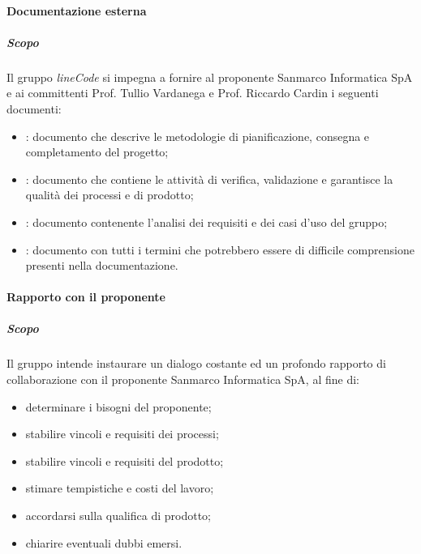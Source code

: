 		\paragraph{Documentazione esterna}
            \subparagraph{Scopo}
    		Il gruppo \textit{lineCode} si impegna a fornire al proponente Sanmarco Informatica SpA e ai committenti Prof. Tullio Vardanega e Prof. Riccardo Cardin i seguenti documenti:
    		\begin{itemize}
    		 	\item {}: documento che descrive le metodologie di pianificazione, consegna e completamento del progetto;
    		 	\item {}: documento che contiene le attività di verifica, validazione e garantisce la qualità dei processi e di prodotto;
    		 	\item {}: documento contenente l'analisi dei requisiti e dei casi d'uso del gruppo;
    		 	\item {}: documento con tutti i termini che potrebbero essere di difficile comprensione presenti nella documentazione.
    		\end{itemize}

    	\paragraph{Rapporto con il proponente}
            \subparagraph{Scopo}
        	Il gruppo intende instaurare un dialogo costante ed un profondo rapporto di collaborazione con il proponente Sanmarco Informatica SpA, al fine di:
        	\begin{itemize}
        		\item determinare i bisogni del proponente;
        		\item stabilire vincoli e requisiti dei processi;
        		\item stabilire vincoli e requisiti del prodotto;
        		\item stimare tempistiche e costi del lavoro;
        		\item accordarsi sulla qualifica di prodotto;
        		\item chiarire eventuali dubbi emersi.
        	\end{itemize}